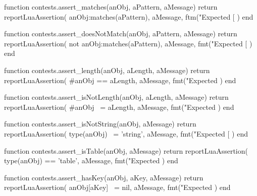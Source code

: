 \stopTestSuite


\startLuaCode
function contests.assert_matches(anObj, aPattern, aMessage)
  return reportLuaAssertion(
    anObj:matches(aPattern),
    aMessage,
    ftm("Expected [%
  )
end
\stopLuaCode

\stopTestSuite


\startLuaCode
function contests.assert_doesNotMatch(anObj, aPattern, aMessage)
  return reportLuaAssertion(
    not anObj:matches(aPattern),
    aMessage,
    fmt("Expected [%
  )
end
\stopLuaCode

\stopTestSuite


\startLuaCode
function contests.assert_length(anObj, aLength, aMessage)
  return reportLuaAssertion(
    #anObj == aLength,
    aMessage,
    fmt("Expected %
  )
end
\stopLuaCode

\stopTestSuite


\startLuaCode
function contests.assert_isNotLength(anObj, aLength, aMessage)
  return reportLuaAssertion(
    #anObj ~= aLength,
    aMessage,
    fmt("Expected %
  )
end
\stopLuaCode

\stopTestSuite


\startLuaCode
function contests.assert_isNotString(anObj, aMessage)
  return reportLuaAssertion(
    type(anObj) ~= 'string',
    aMessage,
    fmt("Expected [%
  )
end
\stopLuaCode

\stopTestSuite


\startLuaCode
function contests.assert_isTable(anObj, aMessage)
  return reportLuaAssertion(
    type(anObj) == 'table',
    aMessage,
    fmt("Expected %
  )
end
\stopLuaCode

\stopTestSuite


\startLuaCode
function contests.assert_hasKey(anObj, aKey, aMessage)
  return reportLuaAssertion(
    anObj[aKey] ~= nil,
    aMessage,
    fmt("Expected %
  )
end
\stopLuaCode

